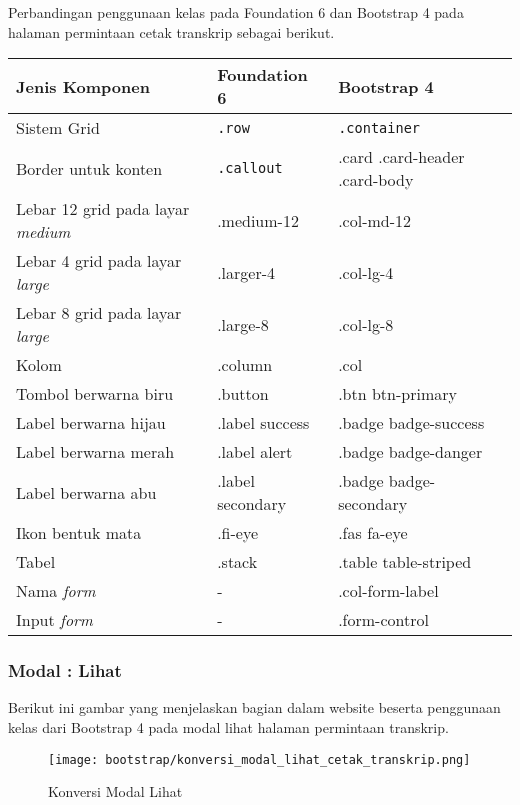 \noindent Perbandingan penggunaan kelas pada Foundation 6 dan Bootstrap 4 pada halaman permintaan cetak transkrip sebagai berikut.\\ 
\begin{tabular}{| p{} | p{} | p{} |} 
	\hline
	\textbf{Jenis Komponen} & \textbf{Foundation 6} & \textbf{Bootstrap 4}  \\ [0.5ex] 
	\hline	
	Sistem Grid & \texttt{.row} &   \texttt{.container} \\ 
	\hline	
	Border untuk konten & \texttt{.callout} &  .card \newline .card-header \newline .card-body \\
	\hline	
	Lebar 12 grid pada layar \textit{medium} & .medium-12 &  .col-md-12 \\
	\hline	
	Lebar 4 grid pada layar \textit{large} & .larger-4 &  .col-lg-4 \\
	\hline
	Lebar 8 grid pada layar \textit{large} & .large-8 &  .col-lg-8 \\
	\hline
	Kolom & .column &  .col \\	
	\hline	
	Tombol berwarna biru & .button &  .btn btn-primary\\
	\hline	
	Label berwarna hijau & .label success &  .badge badge-success \\
	\hline	
	Label berwarna merah &.label alert & .badge badge-danger  \\
	\hline	
	Label berwarna abu &.label secondary & .badge badge-secondary  \\
	\hline	
	Ikon bentuk mata & .fi-eye &  .fas fa-eye \\	
	\hline	
	Tabel & .stack & .table table-striped  \\
	\hline	
	Nama \textit{form} & - & .col-form-label  \\ 
	\hline	
	Input \textit{form} & - & .form-control  \\ [1ex] 
	\hline
\end{tabular}

\subsubsection{Modal : Lihat}
\noindent Berikut ini gambar yang menjelaskan bagian dalam website beserta penggunaan kelas dari Bootstrap 4 pada modal lihat halaman permintaan transkrip.\\
\begin{figure} [H]
	\centering  
	\texttt{[image: bootstrap/konversi\_modal\_lihat\_cetak\_transkrip.png]}  
	\caption{Konversi Modal Lihat} 
\end{figure}

